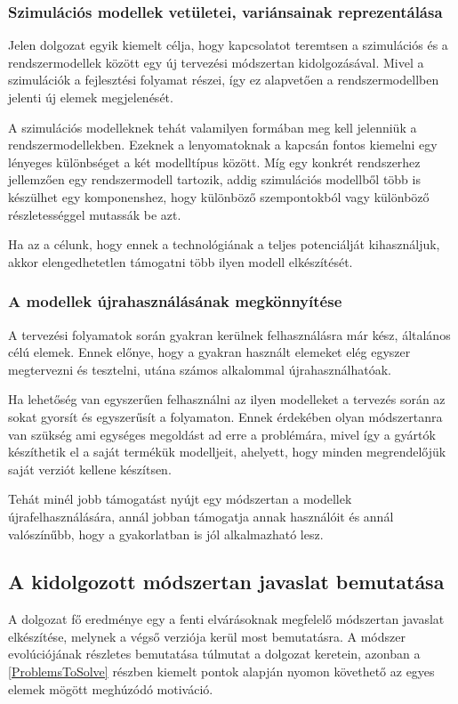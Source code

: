         \subsubsection{Szimulációs modellek vetületei, variánsainak reprezentálása} \label{sec:SzimIntKov}
        Jelen dolgozat egyik kiemelt célja, hogy kapcsolatot teremtsen a szimulációs és a rendszermodellek között egy új tervezési módszertan kidolgozásával.
        Mivel a szimulációk a fejlesztési folyamat részei, így ez alapvetően a rendszermodellben jelenti új elemek megjelenését.
        
        A szimulációs modelleknek tehát valamilyen formában meg kell jelenniük a rendszermodellekben.
        Ezeknek a lenyomatoknak a kapcsán fontos kiemelni egy lényeges különbséget a két modelltípus között.
        Míg egy konkrét rendszerhez jellemzően egy rendszermodell tartozik, addig szimulációs modellből több is készülhet egy komponenshez, hogy különböző szempontokból vagy különböző részletességgel mutassák be azt.
        
        Ha az a célunk, hogy ennek a technológiának a teljes potenciálját kihasználjuk, akkor elengedhetetlen támogatni több ilyen modell elkészítését.

        \subsubsection{A modellek újrahasználásának megkönnyítése} \label{sec:Ujrahasznalas}
        A tervezési folyamatok során gyakran kerülnek felhasználásra már kész, általános célú elemek.
        Ennek előnye, hogy a gyakran használt elemeket elég egyszer megtervezni és tesztelni, utána számos alkalommal újrahasználhatóak.
        
        Ha lehetőség van egyszerűen felhasználni az ilyen modelleket a tervezés során az sokat gyorsít és egyszerűsít a folyamaton.
        Ennek érdekében olyan módszertanra van szükség ami egységes megoldást ad erre a problémára, mivel így a gyártók készíthetik el a saját termékük modelljeit, ahelyett, hogy minden megrendelőjük saját verziót kellene készítsen.
        
        Tehát minél jobb támogatást nyújt egy módszertan a modellek újrafelhasználására, annál jobban támogatja annak használóit és annál valószínűbb, hogy a gyakorlatban is jól alkalmazható lesz.

    \subsection{A kidolgozott módszertan javaslat bemutatása}
    A dolgozat fő eredménye egy a fenti elvárásoknak megfelelő módszertan javaslat elkészítése, melynek a végső verziója kerül most bemutatásra. A módszer evolúciójának részletes bemutatása túlmutat a dolgozat keretein, azonban a \ref{ProblemsToSolve} részben kiemelt pontok alapján nyomon követhető az egyes elemek mögött meghúzódó motiváció.
        

